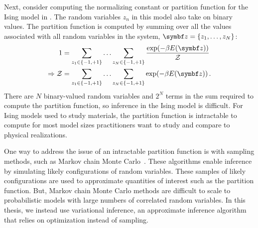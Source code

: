 Next, consider computing the normalizing constant or partition function for the Ising model in . The random variables $z_n$ in this model also take on binary values. The partition function is computed by summing over all the values associated with all random variables in the system, $\mbz = \{z_1, \ldots, z_N\}$:
\begin{align}
1 &= \sum_{z_1 \in \{-1, +1\}} \ldots \sum_{z_N \in \{-1, +1\}} \frac{\exp(-\beta E(\mbz))}{\cZ}\\
\Rightarrow \cZ &= \sum_{z_1 \in \{-1, +1\}} \ldots \sum_{z_N \in \{-1, +1\}} \exp(-\beta E(\mbz))\, .
\label{eq:intractable-partition}
\end{align}
There are $N$ binary-valued random variables and $2^N$ terms in the sum required to compute the partition function, so inference in the Ising model is difficult. For Ising models used to study materials, the partition function is intractable to compute for most model sizes practitioners want to study and compare to physical realizations.

One way to address the issue of an intractable partition function is with sampling methods, such as Markov chain Monte Carlo~\citep{metropolis1953equation}. These algorithms enable inference by simulating likely configurations of random variables. These samples of likely configurations are used to approximate quantities of interest such as the partition function. But, Markov chain Monte Carlo methods are difficult to scale to probabilistic models with large numbers of correlated random variables. In this thesis, we instead use variational inference, an approximate inference algorithm that relies on optimization instead of sampling.

